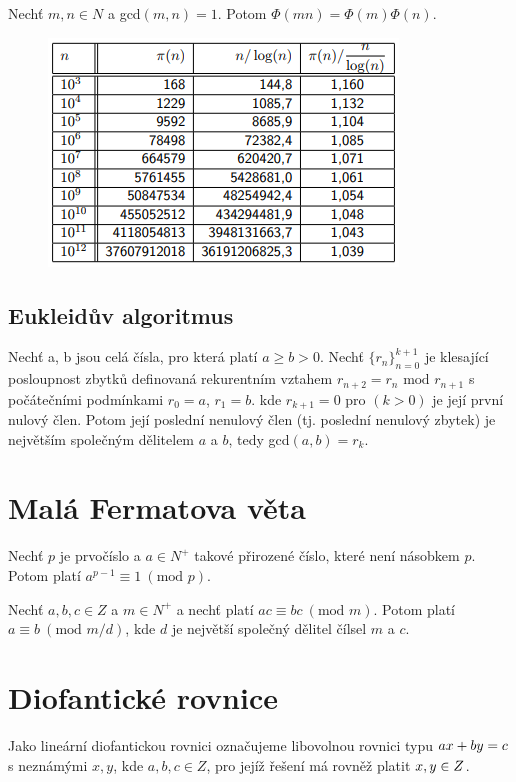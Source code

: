 \documentclass{szzclass}
\begin{document}
Nechť $m, n \in N$ a gcd$(m, n) = 1$. Potom $\Phi(mn) = \Phi(m)\Phi(n)$.



\begin{figure}[!h]
\includegraphics[width=.75\textwidth, center]{topics/bi-spol-33/images/primes.png}
\end{figure}


\subsection{Eukleidův algoritmus}
Nechť a, b jsou celá čísla, pro která platí
$a \geq b > 0$. Nechť $\{r_n\}^{k+1}_{n=0}$ je klesající posloupnost zbytků definovaná
rekurentním vztahem $r_{n+2} = r_n\text{ mod }r_{n+1}$ s počátečními podmínkami $r_0 = a$, $r_1 = b$.
kde $r_{k+1} = 0$ pro $(k > 0)$ je její první nulový člen. Potom její poslední
nenulový člen (tj. poslední nenulový zbytek) je největším společným
dělitelem $a$ a $b$, tedy gcd$ (a, b) = r_k$.

\newpage

\section{Malá Fermatova věta}

Nechť $p$ je prvočíslo a $a \in N^+$ takové přirozené
číslo, které není násobkem $p$. Potom platí $a^{p-1} \equiv 1~(\text{mod }p)$.

Nechť $a, b, c \in Z$ a $m \in N^+$ a nechť platí $ac \equiv bc~(\text{mod } m)$. Potom platí
$a \equiv b~(\text{mod } m/d)$, kde $d$ je největší společný dělitel čílsel $m$ a $c$.


\section{Diofantické rovnice}

Jako lineární diofantickou rovnici označujeme libovolnou rovnici typu $ax +\nolinebreak by = c$
s neznámými $x, y$, kde $a, b, c \in Z$, pro jejíž řešení má rovněž platit $x, y \in\nolinebreak Z$.
\end{document}
